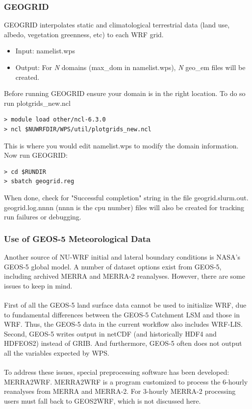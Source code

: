 \begin{frame}[fragile]\frametitle{GEOGRID}

\scriptsize{
GEOGRID interpolates static and climatological terrestrial data (land use, albedo, vegetation greenness, etc) to each WRF grid.
\begin{itemize}
\item Input: namelist.wps
\item Output: For \emph{N} domains (max\_dom in namelist.wps), \emph{N} geo\_em files will be created.
\end{itemize}\scriptsize}    
\hrulefill\par
\scriptsize{Before running GEOGRID ensure your domain is in the right location. To do so run plotgrids\_new.ncl}
\verbatimfont{\scriptsize}%
\begin{verbatim}
> module load other/ncl-6.3.0
> ncl $NUWRFDIR/WPS/util/plotgrids_new.ncl
\end{verbatim}
\scriptsize{This is where you would edit namelist.wps to modify the domain information.
Now run GEOGRID:}
\verbatimfont{\scriptsize}%
\begin{verbatim}
> cd $RUNDIR
> sbatch geogrid.reg
\end{verbatim}
When done, check for  "Successful completion"  string in the file geogrid.slurm.out.
geogrid.log.nnnn (nnnn is the cpu number) files will also be created for tracking run failures or debugging.

\end{frame}

\begin{frame}[fragile]\frametitle{Use of GEOS-5 Meteorological Data}

\footnotesize{
Another  source of NU-WRF initial and lateral boundary conditions is NASA's GEOS-5 global
model. A number of dataset options exist from GEOS-5, including 
archived MERRA  and MERRA-2 reanalyses. However, there are some issues to keep in mind.\\
\mbox{}\\
First of all the GEOS-5 land surface data cannot be used to initialize WRF, due to fundamental 
differences between the GEOS-5 Catchment LSM and those in WRF. 
Thus, the GEOS-5 data in the current workflow also includes WRF-LIS. 
Second, GEOS-5 writes output in netCDF (and historically HDF4 and HDFEOS2) instead
of GRIB. And furthermore, GEOS-5 often does not output all the variables expected by
WPS.\\
\mbox{}\\
To address these issues, special preprocessing software has been developed: 
MERRA2WRF. MERRA2WRF is a program customized to process the 6-hourly
reanalyses from MERRA and MERRA-2. For 3-hourly MERRA-2 processing users must fall back 
to GEOS2WRF, which is not discussed here.}

\end{frame}

